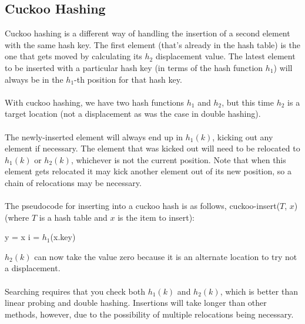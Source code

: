 \documentclass[]{article}
\theoremstyle{definition}
\newcommand{\lecture}[1]{\marginpar{{\footnotesize $\leftarrow$ \underline{#1}}}}
\begin{document}
		\subsection{Cuckoo Hashing}
			Cuckoo hashing is a different way of handling the insertion of a second element with the same hash key. The first element (that's already in the hash table) is the one that gets moved by calculating its $h_2$ displacement value. The latest element to be inserted with a particular hash key (in terms of the hash function $h_1$) will always be in the $h_1$-th position for that hash key.
			\\ \\
			\lecture{March 5, 2013}
			With cuckoo hashing, we have two hash functions $h_1$ and $h_2$, but this time $h_2$ is a target location (not a displacement as was the case in double hashing).
			\\ \\
			The newly-inserted element will always end up in $h_1(k)$, kicking out any element if necessary. The element that was kicked out will need to be relocated to $h_1(k)$ or $h_2(k)$, whichever is not the current position. Note that when this element gets relocated it may kick another element out of its new position, so a chain of relocations may be necessary.
			\\ \\
			The pseudocode for inserting into a cuckoo hash is as follows, cuckoo-insert($T$, $x$) (where $T$ is a hash table and $x$ is the item to insert): \\
			\begin{algorithm}[H]
				y = x\;
				i = $h_1$(x.key)\;
			\end{algorithm}

			$h_2(k)$ can now take the value zero because it is an alternate location to try \textendash{} not a displacement.
			\\ \\
			Searching requires that you check both $h_1(k)$ and $h_2(k)$, which is better than linear probing and double hashing. Insertions will take longer than other methods, however, due to the possibility of multiple relocations being necessary.
\end{document}
